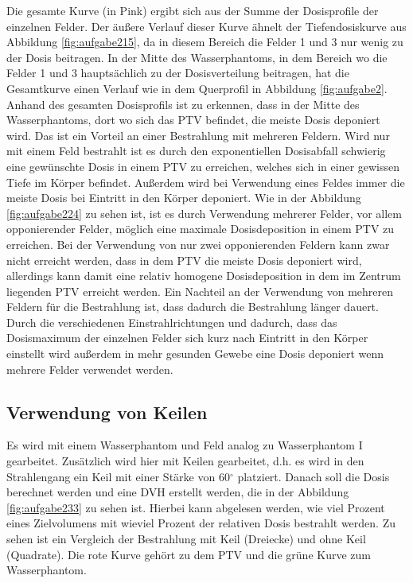 Die gesamte Kurve (in Pink) ergibt sich aus der Summe der Dosisprofile der einzelnen
Felder. Der äußere Verlauf dieser Kurve ähnelt der Tiefendosiskurve aus Abbildung
\ref{fig:aufgabe215}, da in diesem Bereich die Felder 1 und 3 nur wenig zu
der Dosis beitragen. In der Mitte des Wasserphantoms, in dem Bereich wo die
Felder 1 und 3 hauptsächlich zu der Dosisverteilung beitragen, hat die Gesamtkurve
einen Verlauf wie in dem Querprofil in Abbildung \ref{fig:aufgabe2}. \\
Anhand des gesamten Dosisprofils ist zu erkennen, dass in der Mitte des Wasserphantoms,
dort wo sich das PTV befindet, die meiste Dosis deponiert wird.
Das ist ein Vorteil an einer Bestrahlung mit mehreren Feldern. Wird nur mit einem
Feld bestrahlt ist es durch den exponentiellen Dosisabfall schwierig eine gewünschte
Dosis in einem PTV zu erreichen, welches sich in einer gewissen Tiefe im Körper
befindet. Außerdem wird bei Verwendung eines Feldes immer die meiste Dosis bei
Eintritt in den Körper deponiert. Wie in der Abbildung \ref{fig:aufgabe224} zu sehen
ist, ist es durch Verwendung mehrerer Felder, vor allem opponierender Felder, möglich
eine maximale Dosisdeposition in einem PTV zu erreichen.
Bei der Verwendung von nur zwei opponierenden Feldern kann zwar nicht erreicht werden,
dass in dem PTV die meiste Dosis deponiert wird, allerdings kann damit eine relativ
homogene Dosisdeposition in dem im Zentrum liegenden PTV erreicht werden.
Ein Nachteil an der Verwendung von mehreren Feldern für die
Bestrahlung ist, dass dadurch die Bestrahlung länger dauert. Durch
die verschiedenen Einstrahlrichtungen und dadurch, dass das Dosismaximum der
einzelnen Felder sich kurz nach Eintritt in den Körper einstellt wird außerdem in mehr
gesunden Gewebe eine Dosis deponiert wenn mehrere Felder verwendet werden.


\subsection{Verwendung von Keilen}
\label{subsec:Keilen}

Es wird mit einem Wasserphantom und Feld analog zu Wasserphantom I gearbeitet. Zusätzlich wird hier mit Keilen gearbeitet, d.h. es wird in den Strahlengang ein Keil mit einer Stärke von 60$^\circ$ platziert. Danach soll die Dosis berechnet werden und eine DVH erstellt werden, die in der Abbildung \ref{fig:aufgabe233} zu sehen ist. Hierbei kann abgelesen werden, wie viel Prozent eines Zielvolumens mit wieviel Prozent der relativen Dosis bestrahlt werden. Zu sehen ist ein Vergleich der Bestrahlung mit Keil (Dreiecke) und ohne Keil (Quadrate). Die rote Kurve gehört zu dem PTV und die grüne Kurve zum Wasserphantom.


